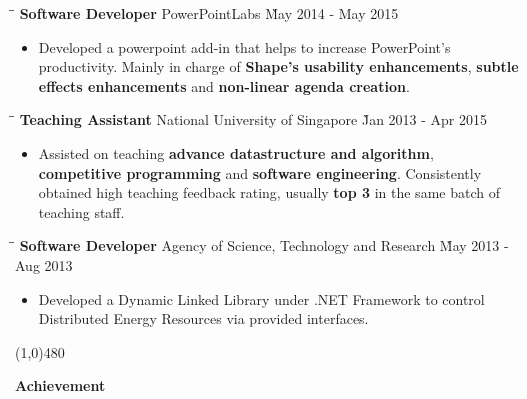\documentclass{article}
\begin{document}

\begin{tabbing}
\hspace{2.6in}\= \hspace{2.6in}\= \kill
{\bf Software Developer} \> PowerPointLabs \`May 2014 - May 2015\
\end{tabbing}

\begin{itemize}
    \item Developed a powerpoint add-in that helps to increase PowerPoint's productivity. Mainly in charge of {\bf Shape's usability enhancements}, {\bf subtle effects enhancements} and {\bf non-linear agenda creation}.\vspace{-6pt}
\end{itemize}

\begin{tabbing}
\hspace{2.2in}\= \hspace{2.6in}\= \kill
{\bf Teaching Assistant} \> National University of Singapore \`Jan 2013 - Apr 2015\
\end{tabbing}

\begin{itemize}
    \item Assisted on teaching {\bf advance datastructure and algorithm}, {\bf competitive programming} and {\bf software engineering}. Consistently obtained high teaching feedback rating, usually {\bf top 3} in the same batch of teaching staff.
\end{itemize}

\begin{tabbing}
\hspace{1.8in} \= \hspace{2.6in}\= \kill
{\bf Software Developer} \> Agency of Science, Technology and Research \`May 2013 - Aug 2013\
\end{tabbing}

\begin{itemize}
  \item Developed a Dynamic Linked Library under .NET Framework to control Distributed Energy Resources via provided interfaces.
\end{itemize}

\centerline{\line(1,0){480}}

\medskip

\centerline {\Large \bf Achievement}

\medskip
\end{document}
